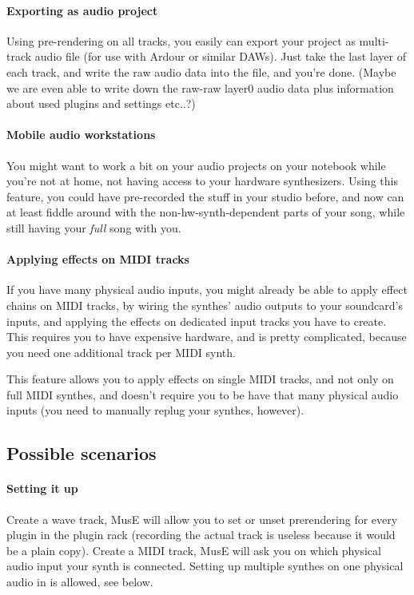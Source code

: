 \documentclass[a4paper]{report}
\begin{document}
\paragraph{Exporting as audio project}
Using pre-rendering on all tracks, you easily can export your project
as multi-track audio file (for use with Ardour or similar DAWs).
Just take the last layer of each track, and write the raw audio data
into the file, and you're done. (Maybe we are even able to write down
the raw-raw layer0 audio data plus information about used plugins and
settings etc..?)

\paragraph{Mobile audio workstations}
You might want to work a bit on your audio projects on your notebook
while you're not at home, not having access to your hardware synthesizers.
Using this feature, you could have pre-recorded the stuff in your studio
before, and now can at least fiddle around with the non-hw-synth-dependent
parts of your song, while still having your \emph{full} song with you.

\paragraph{Applying effects on MIDI tracks}
If you have many physical audio inputs, you might already be able to
apply effect chains on MIDI tracks, by wiring the synthes' audio
outputs to your soundcard's inputs, and applying the effects on
dedicated input tracks you have to create. This requires you to have
expensive hardware, and is pretty complicated, because you need one
additional track per MIDI synth.

This feature allows you to apply effects on single MIDI tracks, and not
only on full MIDI synthes, and doesn't require you to be have that
many physical audio inputs (you need to manually replug your synthes,
however).

\subsection{Possible scenarios}
\paragraph{Setting it up}
Create a wave track, MusE will allow you to set or unset prerendering
for every plugin in the plugin rack (recording the actual track is
useless because it would be a plain copy).
Create a MIDI track, MusE will ask you on which physical audio input
your synth is connected. Setting up multiple synthes on one physical
audio in is allowed, see below.
\end{document}
